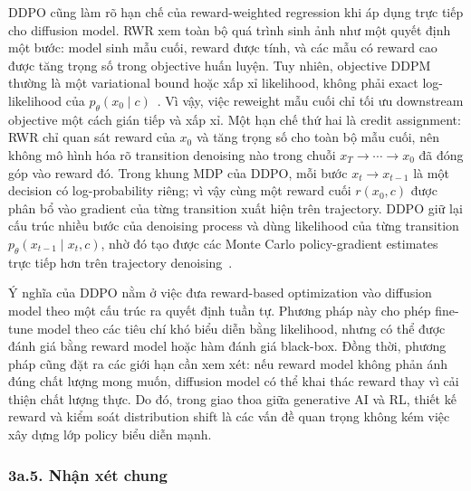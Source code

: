 DDPO cũng làm rõ hạn chế của reward-weighted regression khi áp dụng trực tiếp cho diffusion model.
RWR xem toàn bộ quá trình sinh ảnh như một quyết định một bước: model sinh mẫu cuối, reward được tính, và các mẫu có reward cao được tăng trọng số trong objective huấn luyện.
Tuy nhiên, objective DDPM thường là một variational bound hoặc xấp xỉ likelihood, không phải exact log-likelihood của $p_\theta(x_0\mid c)$~\citep{black2024ddpo}.
Vì vậy, việc reweight mẫu cuối chỉ tối ưu downstream objective một cách gián tiếp và xấp xỉ.
Một hạn chế thứ hai là credit assignment: RWR chỉ quan sát reward của $x_0$ và tăng trọng số cho toàn bộ mẫu cuối, nên không mô hình hóa rõ transition denoising nào trong chuỗi $x_T\rightarrow\cdots\rightarrow x_0$ đã đóng góp vào reward đó.
Trong khung MDP của DDPO, mỗi bước $x_t\rightarrow x_{t-1}$ là một decision có log-probability riêng; vì vậy cùng một reward cuối $r(x_0,c)$ được phân bổ vào gradient của từng transition xuất hiện trên trajectory.
DDPO giữ lại cấu trúc nhiều bước của denoising process và dùng likelihood của từng transition $p_\theta(x_{t-1}\mid x_t,c)$, nhờ đó tạo được các Monte Carlo policy-gradient estimates trực tiếp hơn trên trajectory denoising~\citep{black2024ddpo}.

Ý nghĩa của DDPO nằm ở việc đưa reward-based optimization vào diffusion model theo một cấu trúc ra quyết định tuần tự.
Phương pháp này cho phép fine-tune model theo các tiêu chí khó biểu diễn bằng likelihood, nhưng có thể được đánh giá bằng reward model hoặc hàm đánh giá black-box.
Đồng thời, phương pháp cũng đặt ra các giới hạn cần xem xét: nếu reward model không phản ánh đúng chất lượng mong muốn, diffusion model có thể khai thác reward thay vì cải thiện chất lượng thực.
Do đó, trong giao thoa giữa generative AI và RL, thiết kế reward và kiểm soát distribution shift là các vấn đề quan trọng không kém việc xây dựng lớp policy biểu diễn mạnh.

\subsubsection*{3a.5. Nhận xét chung}

